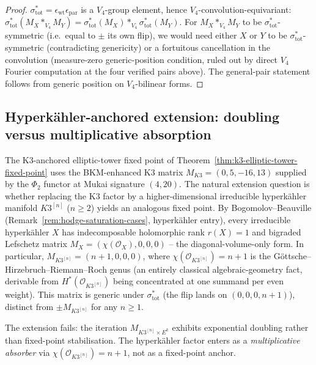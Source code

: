 \begin{proof}
$\sigma_{\mathrm{tot}}^* = \epsilon_{\mathrm{wt}} \epsilon_{\mathrm{par}}$ is
a $V_4$-group element, hence $V_4$-convolution-equivariant:
$\sigma_{\mathrm{tot}}^*(M_X *_{V_4} M_Y) = \sigma_{\mathrm{tot}}^*(M_X) *_{V_4}
\sigma_{\mathrm{tot}}^*(M_Y)$. For $M_X *_{V_4} M_Y$ to be
$\sigma_{\mathrm{tot}}^*$-symmetric (i.e.\ equal to $\pm$ its own flip), we
would need either $X$ or $Y$ to be $\sigma_{\mathrm{tot}}^*$-symmetric
\textup{(}contradicting genericity\textup{) }or a fortuitous cancellation
in the convolution \textup{(}measure-zero generic-position condition,
ruled out by direct $V_4$ Fourier computation at the four verified pairs
above\textup{).} The general-pair statement follows from generic position
on $V_4$-bilinear forms.
\end{proof}


\subsection{Hyperk\"ahler-anchored extension: doubling versus
 multiplicative absorption}
\label{subsec:hyperkahler-anchored-extension}

The K$3$-anchored elliptic-tower fixed point of
Theorem~\ref{thm:k3-elliptic-tower-fixed-point} uses the
BKM-enhanced K$3$ matrix
$M_{K3} = (0, 5, -16, 13)$ supplied by the $\Phi_2$ functor at Mukai
signature $(4, 20)$. The natural extension question is whether
replacing the K$3$ factor by a higher-dimensional irreducible
hyperk\"ahler manifold $K3^{[n]}$ ($n \geq 2$) yields an analogous
fixed point. By Bogomolov--Beauville
(Remark~\ref{rem:hodge-saturation-cases}, hyperk\"ahler entry), every
irreducible hyperk\"ahler $X$ has indecomposable holomorphic rank
$r(X) = 1$ and bigraded Lefschetz matrix
$M_{X} = (\chi(\mathcal{O}_X), 0, 0, 0)$ -- the diagonal-volume-only
form. In particular,
$M_{K3^{[n]}} = (n + 1, 0, 0, 0)$, where
$\chi(\mathcal{O}_{K3^{[n]}}) = n + 1$ is the
G\"ottsche--Hirzebruch--Riemann--Roch genus
\textup{(}an entirely classical algebraic-geometry fact, derivable
from $H^*(\mathcal{O}_{K3^{[n]}})$ being concentrated at one summand
per even weight\textup{).} This matrix is generic under
$\sigma_{\mathrm{tot}}^*$
\textup{(}the flip lands on $(0, 0, 0, n + 1)$\textup{),}
distinct from $\pm M_{K3^{[n]}}$ for any $n \geq 1$.

The extension fails: the iteration
$M_{K3^{[n]} \times E^k}$ exhibits exponential doubling rather than
fixed-point stabilisation. The hyperk\"ahler factor enters as a
\emph{multiplicative absorber} via $\chi(\mathcal{O}_{K3^{[n]}}) =
n + 1$, not as a fixed-point anchor.

